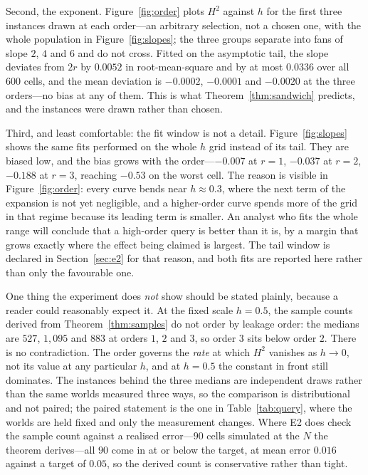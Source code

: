Second, the exponent. Figure~\ref{fig:order} plots $H^{2}$ against $h$ for the first three
instances drawn at each order---an arbitrary selection, not a chosen one, with the whole
population in Figure~\ref{fig:slopes}; the three groups separate into fans of slope $2$, $4$ and $6$ and do
not cross. Fitted on the asymptotic tail, the slope deviates from $2r$ by $0.0052$ in
root-mean-square and by at most $0.0336$ over all $600$ cells, and the mean deviation is
$-0.0002$, $-0.0001$ and $-0.0020$ at the three orders---no bias at any of them. This is what
Theorem~\ref{thm:sandwich} predicts, and the instances were drawn rather than chosen.
\NUM{}

Third, and least comfortable: the fit window is not a detail. Figure~\ref{fig:slopes} shows the
same fits performed on the whole $h$ grid instead of its tail. They are biased low, and the
bias grows with the order---$-0.007$ at $r=1$, $-0.037$ at $r=2$, $-0.188$ at $r=3$, reaching
$-0.53$ on the worst cell. The reason is visible in Figure~\ref{fig:order}: every curve bends
near $h\approx0.3$, where the next term of the expansion is not yet negligible, and a
higher-order curve spends more of the grid in that regime because its leading term is smaller.
An analyst who fits the whole range will conclude that a high-order query is better than it is,
by a margin that grows exactly where the effect being claimed is largest. The tail window is
declared in Section~\ref{sec:e2} for that reason, and both fits are reported here rather than
only the favourable one.

One thing the experiment does \emph{not} show should be stated plainly, because a reader could
reasonably expect it. At the fixed scale $h=0.5$, the sample counts derived from
Theorem~\ref{thm:samples} do not order by leakage order: the medians are $527$, $1{,}095$ and
$883$ at orders $1$, $2$ and $3$, so order $3$ sits below order $2$. There is no contradiction.
The order governs the \emph{rate} at which $H^{2}$ vanishes as $h\to0$, not its value at any
particular $h$, and at $h=0.5$ the constant in front still dominates. The instances behind the
three medians are independent draws rather than the same worlds measured three ways, so the
comparison is distributional and not paired; the paired statement is the one in
Table~\ref{tab:query}, where the worlds are held fixed and only the measurement changes.
Where E2 does check the sample count against a realised error---$90$ cells simulated at the $N$
the theorem derives---all $90$ come in at or below the target, at mean error $0.016$ against a
target of $0.05$, so the derived count is conservative rather than tight. \NUM{}

